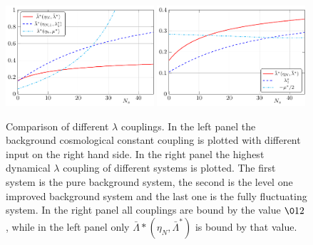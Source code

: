 \documentclass[11pt]{book} %
\begin{document}
{\begin{figure}[!ht]
\includegraphics[width=0.49\textwidth]{Background-lam-comparison}
\hfill
\includegraphics[width=0.49\textwidth]{Fluctuation-lam-comparison}
\caption{Comparison of different $\lambda$ couplings.
In the left panel the background cosmological constant coupling is plotted with different input on the right hand side.
In the right panel the highest dynamical $\lambda$ coupling of different systems is plotted.
The first system is the pure background system, the second is the level one improved background system and the last one is the fully fluctuating system.
In the right panel all couplings are bound by the value $\012$, while in the left panel only $\bar \Lambda*(\eta_N,\bar\Lambda^*)$ is bound by that value.}
\label{fig:Comparison-of-lam}
\end{figure}

}
\end{document}
